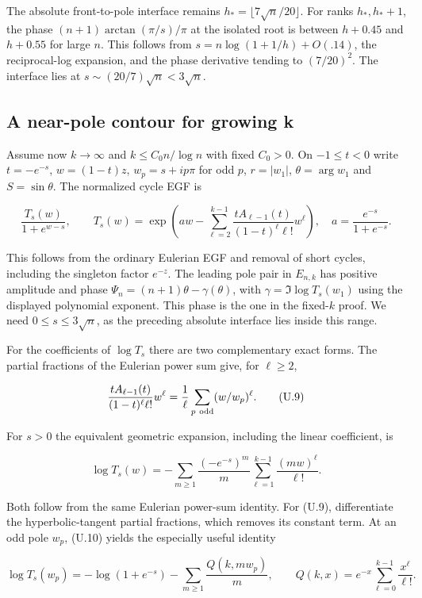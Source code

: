 \documentclass[11pt]{article}
\begin{document}
The absolute front-to-pole interface remains $h_*=\lfloor7\sqrt n/20\rfloor$. For ranks $h_*,h_*+1$, the phase $(n+1)\arctan(\pi/s)/\pi$ at the isolated root is between $h+0.45$ and $h+0.55$ for large $n$. This follows from $s=n\log(1+1/h)+O(.14)$, the reciprocal-log expansion, and the phase derivative tending to $(7/20)^2$. The interface lies at $s\sim(20/7)\sqrt n<3\sqrt n$.

\subsection{A near-pole contour for growing k}

Assume now $k\to\infty$ and $k\le C_0 n/\log n$ with fixed $C_0>0$. On $-1\le t<0$ write $t=-e^{-s}$, $w=(1-t)z$, $w_p=s+ip\pi$ for odd $p$, $r=|w_1|$, $\theta=\arg w_1$ and $S=\sin\theta$. The normalized cycle EGF is

\[
\frac{T_s(w)}{1+e^{w-s}},\qquad
T_s(w)=\exp\left(aw-\sum_{\ell=2}^{k-1}
\frac{t A_{\ell-1}(t)}{(1-t)^\ell\ell!}w^\ell\right),
\quad a=\frac{e^{-s}}{1+e^{-s}}.
\]

This follows from the ordinary Eulerian EGF and removal of short cycles, including the singleton factor $e^{-z}$. The leading pole pair in $E_{n,k}$ has positive amplitude and phase $\Psi_n=(n+1)\theta-\gamma(\theta)$, with $\gamma=\Im\log T_s(w_1)$ using the displayed polynomial exponent. This phase is the one in the fixed-$k$ proof. We need $0\le s\le3\sqrt n$, as the preceding absolute interface lies inside this range.

For the coefficients of $\log T_s$ there are two complementary exact forms. The partial fractions of the Eulerian power sum give, for $\ell\ge2$,

\[
\frac{t A_{\ell-1}(t)}{(1-t)^\ell\ell!}w^\ell
=\frac1\ell\sum_{p\ {\rm odd}}(w/w_p)^\ell .
\tag{U.9}
\]

For $s>0$ the equivalent geometric expansion, including the linear coefficient, is

\[
\log T_s(w)=-\sum_{m\ge1}\frac{(-e^{-s})^m}{m}
                         \sum_{\ell=1}^{k-1}\frac{(mw)^\ell}{\ell!}.
\tag{U.10}
\]

Both follow from the same Eulerian power-sum identity. For (U.9), differentiate the hyperbolic-tangent partial fractions, which removes its constant term. At an odd pole $w_p$, (U.10) yields the especially useful identity

\[
\log T_s(w_p)=-\log(1+e^{-s})-\sum_{m\ge1}\frac{Q(k,mw_p)}{m},
\qquad Q(k,x)=e^{-x}\sum_{\ell=0}^{k-1}\frac{x^\ell}{\ell!}.
\tag{U.11}
\]
\end{document}
